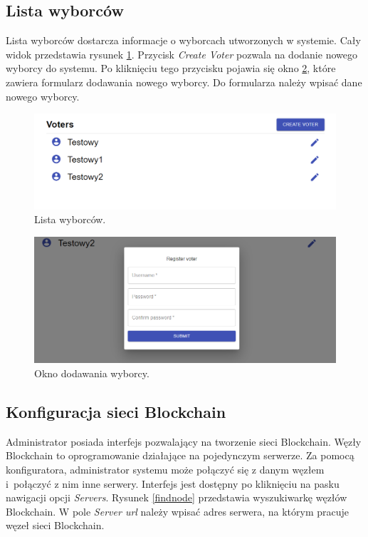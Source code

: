 \documentclass[a4paper,12pt]{book}
\begin{document}
\newpage

\subsection{Lista wyborców}

Lista wyborców dostarcza informacje o wyborcach utworzonych w systemie. Cały widok przedstawia rysunek \ref{voterslist}. Przycisk \textit{Create Voter} pozwala na dodanie nowego wyborcy do systemu. Po kliknięciu tego przycisku pojawia się okno \ref{addvoter}, które zawiera formularz dodawania nowego wyborcy. Do formularza należy wpisać dane nowego wyborcy.

\begin{figure}[h]
	\centering
	\includegraphics[width=\textwidth]{images/voterslist.png}
	\caption{Lista wyborców.}\label{voterslist}
\end {figure}

\begin{figure}[h]
	\centering
	\includegraphics[width=\textwidth]{images/addvoter.png}
	\caption{Okno dodawania wyborcy.}\label{addvoter}
\end {figure}

\newpage

\subsection{Konfiguracja sieci Blockchain}

Administrator posiada interfejs pozwalający na tworzenie sieci Blockchain. Węzły Blockchain to oprogramowanie działające na pojedynczym serwerze. Za pomocą konfiguratora, administrator systemu może połączyć się z danym węzłem i~połączyć z nim inne serwery. Interfejs jest dostępny po kliknięciu na pasku nawigacji opcji \textit{Servers}. Rysunek \ref{findnode} przedstawia wyszukiwarkę węzłów Blockchain. W pole \textit{Server url} należy wpisać adres serwera, na którym pracuje węzeł sieci Blockchain.
\end{document}
